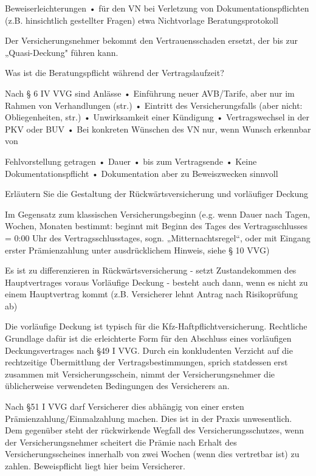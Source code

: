 Beweiserleichterungen
• für den VN bei Verletzung von Dokumentationspflichten (z.B. hinsichtlich gestellter
Fragen) etwa Nichtvorlage Beratungsprotokoll


Der Versicherungsnehmer bekommt den Vertrauensschaden ersetzt, der bis zur „Quasi-Deckung" führen kann. 

Was ist die Beratungspflicht während der Vertragslaufzeit?

Nach § 6 IV VVG sind Anlässe
• Einführung neuer AVB/Tarife, aber nur im Rahmen von Verhandlungen (str.)
• Eintritt des Versicherungsfalls (aber nicht: Obliegenheiten, str.)
• Unwirksamkeit einer Kündigung
• Vertragswechsel in der PKV oder BUV
• Bei konkreten Wünschen des VN nur, wenn Wunsch erkennbar von

Fehlvorstellung getragen
• Dauer
• bis zum Vertragsende
• Keine Dokumentationspflicht
• Dokumentation aber zu Beweiszwecken sinnvoll



Erläutern Sie die Gestaltung der Rückwärtsversicherung und vorläufiger Deckung

Im Gegensatz zum klassischen Versicherungsbeginn (e.g. wenn Dauer nach Tagen, Wochen, Monaten bestimmt: 
beginnt mit Beginn des Tages des Vertragsschlusses = 0:00 Uhr des Vertragsschlusstages, sogn. „Mitternachtsregel“,
oder mit Eingang erster Prämienzahlung unter ausdrücklichem Hinweis, siehe § 10 VVG)

Es ist zu differenzieren in 
Rückwärtsversicherung
- setzt Zustandekommen des Hauptvertrages voraus
Vorläufige Deckung 
- besteht auch dann, wenn es nicht zu einem Hauptvertrag kommt (z.B. Versicherer lehnt Antrag nach Risikoprüfung ab)

Die vorläufige Deckung ist typisch für die Kfz-Haftpflichtversicherung.
Rechtliche Grundlage dafür ist die erleichterte Form für den Abschluss eines vorläufigen Deckungsvertrages nach §49 I VVG.
Durch ein konkludenten Verzicht auf die rechtzeitige  Übermittlung der Vertragsbestimmungen, sprich statdessen erst zusammen mit Versicherungsschein,
nimmt der Versicherungsnehmer die üblicherweise verwendeten Bedingungen des Versicherers an.

Nach §51 I VVG darf Versicherer dies abhängig von einer ersten Prämienzahlung/Einmalzahlung machen. Dies ist in der Praxis unwesentlich.
Dem gegenüber steht der rückwirkende Wegfall des Versicherungsschutzes, wenn der Versicherungsnehmer scheitert die Prämie nach Erhalt des Versicherungsscheines
innerhalb von zwei Wochen (wenn dies vertretbar ist) zu zahlen. Beweispflicht liegt hier beim Versicherer.



